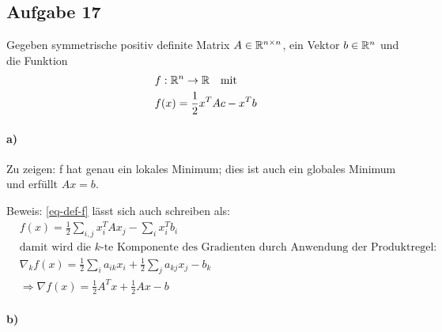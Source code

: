 \subsection*{Aufgabe 17}
Gegeben symmetrische positiv definite Matrix $A \in \mathbb R^{n \times n}$, ein Vektor
$b \in \mathbb R^n$ und die Funktion
\begin{align}
  \nonumber
  & f : \mathbb R^n \rightarrow \mathbb R \quad \text{mit}\\
  \label{eq-def-f}
  & f(x) = \frac{1}{2} x^T A c - x^T b
\end{align}

\paragraph*{a)}
Zu zeigen: f hat genau ein lokales Minimum; dies ist auch ein globales Minimum
und erfüllt $A x = b$.

Beweis: \eqref{eq-def-f} lässt sich auch schreiben als:
\begin{align*}
  &f(x) =  \frac{1}{2} \sum_{i, j}x_i^T A x_j - \sum_i x_i^T b_i\\
  &\text{damit wird die $k$-te Komponente des Gradienten durch Anwendung der Produktregel:}\\
  &\nabla_k f(x)=\frac{1}{2}\sum_{i}a_{ik}x_i+\frac{1}{2}\sum_{j} a_{kj}x_j-b_k\\
  &\Rightarrow \nabla f(x)=\frac{1}{2}A^Tx+\frac{1}{2}Ax-b
\end{align*}



\paragraph*{b)}

